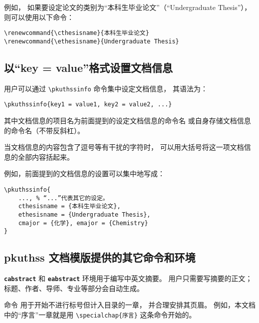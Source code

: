 		例如，
		如果要设定论文的类别为“本科生毕业论文”（“Undergraduate Thesis”），
		则可以使用以下命令：
\begin{Verbatim}[frame = single]
\renewcommand{\cthesisname}{本科生毕业论文}
\renewcommand{\ethesisname}{Undergraduate Thesis}
\end{Verbatim}

		\subsection{以“key = value”格式设置文档信息}

		用户可以通过 \verb|\pkuthssinfo| 命令集中设定文档信息，
		其语法为：
\begin{Verbatim}[frame = single]
% key1、key2、value1、value2 等为具体文档信息的项目名和内容。
\pkuthssinfo{key1 = value1, key2 = value2, ...}
\end{Verbatim}
		其中文档信息的项目名为前面提到的设定文档信息的命令名%
		或自身存储文档信息的命令名（不带反斜杠）。

		当文档信息的内容包含了逗号等有干扰的字符时，
		可以用大括号将这一项文档信息的全部内容括起来。%

		例如，前面提到的文档信息的设置可以集中地写成：
\begin{Verbatim}[frame = single, tabsize = 4]
\pkuthssinfo{
	..., % “...”代表其它的设定。
	cthesisname = {本科生毕业论文},
	ethesisname = {Undergraduate Thesis},
	cmajor = {化学}, emajor = {Chemistry}
}
\end{Verbatim}

		\subsection{pkuthss 文档模版提供的其它命令和环境}\label{ssec:misc}

		\texttt{\bfseries cabstract} 和 \texttt{\bfseries eabstract} %
		环境用于编写中英文摘要。
		用户只需要写摘要的正文；标题、作者、导师、专业等部分会自动生成。

		\texttt{\bfseries\string\specialchap} 命令%
		用于开始不进行标号但计入目录的一章，
		并合理安排其页眉。%
		例如，本文档中的“序言”一章就是用 \verb|\specialchap{序言}| %
		这条命令开始的。%

